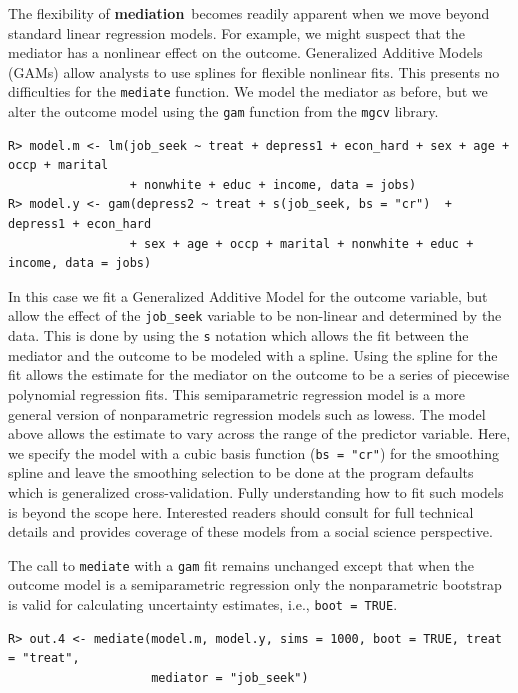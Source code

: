\documentclass[11pt,letterpaper]{article}
\theoremstyle{plain}
\newcommand\bmediation{{\bf mediation}}
\begin{document}
The flexibility of \bmediation\ becomes readily apparent when we move
beyond standard linear regression models.  For example, we might
suspect that the mediator has a nonlinear effect on the outcome.
Generalized Additive Models (GAMs) allow analysts to use splines for
flexible nonlinear fits.  This presents no difficulties for the
\texttt{mediate} function.  We model the mediator as before, but we
alter the outcome model using the \texttt{gam} function from the
\texttt{mgcv} library.
\begin{verbatim}
R> model.m <- lm(job_seek ~ treat + depress1 + econ_hard + sex + age + occp + marital
                 + nonwhite + educ + income, data = jobs)
R> model.y <- gam(depress2 ~ treat + s(job_seek, bs = "cr")  + depress1 + econ_hard
                 + sex + age + occp + marital + nonwhite + educ + income, data = jobs)
\end{verbatim}
In this case we fit a Generalized Additive Model for the outcome
variable, but allow the effect of the \texttt{job\_seek} variable to
be non-linear and determined by the data. This is done by using the
\texttt{s} notation which allows the fit between the mediator and
the outcome to be modeled with a spline.  Using the spline for the fit
allows the estimate for the mediator on the outcome to be a series of
piecewise polynomial regression fits. This semiparametric regression
model is a more general version of nonparametric regression models
such as lowess. The model above allows the estimate to vary across the
range of the predictor variable. Here, we specify the model with a
cubic basis function (\texttt{bs = "cr"}) for the smoothing spline and
leave the smoothing selection to be done at the program defaults which
is generalized cross-validation.  Fully understanding how to fit such
models is beyond the scope here.  Interested readers should consult
\cite{Wood:2006} for full technical details and \cite{Keele:2008}
provides coverage of these models from a social science perspective.

The call to \texttt{mediate} with a \texttt{gam} fit remains
unchanged except that when the outcome model is a semiparametric
regression only the nonparametric bootstrap is valid for calculating
uncertainty estimates, i.e., {\tt boot = TRUE}.
\begin{verbatim}
R> out.4 <- mediate(model.m, model.y, sims = 1000, boot = TRUE, treat = "treat",
                    mediator = "job_seek")
\end{verbatim}
\end{document}
